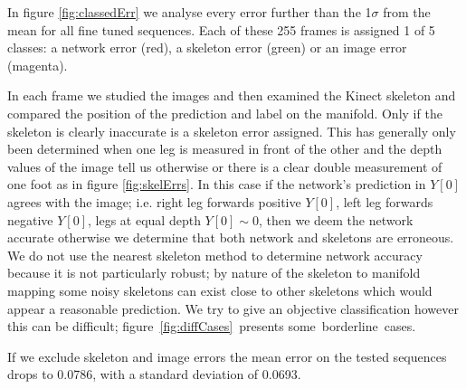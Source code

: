 \documentclass[11pt]{article} %
\begin{document}
In figure \ref{fig:classedErr} we analyse every error further than the 1$\sigma$ from the mean for all fine tuned sequences. Each of these 255 frames is assigned 1 of 5 classes: a network error (red), a skeleton error (green) or an image error (magenta).

In each frame we studied the images and then examined the Kinect skeleton and compared the position of the prediction and label on the manifold. Only if the skeleton is clearly inaccurate is a skeleton error assigned. This has generally only been determined when one leg is measured in front of the other and the depth values of the image tell us otherwise or there is a clear double measurement of one foot as in figure \ref{fig:skelErrs}. In this case if the network's prediction in $Y[0]$ agrees with the image; i.e. right leg forwards positive $Y[0]$,  left leg forwards negative $Y[0]$, legs at equal depth $Y[0]\sim 0$, then we deem the network accurate otherwise we determine that both network and skeletons are erroneous. We do not use the nearest skeleton method to determine network accuracy because it is not particularly robust; by nature of the skeleton to manifold mapping some noisy skeletons can exist close to other skeletons which would appear a reasonable prediction. We try to give an objective classification however this can be difficult; figure~\ref{fig:diffCases}~presents some~borderline~cases. 

If we exclude skeleton and image errors the mean error on the tested sequences drops to 0.0786, with a standard deviation of 0.0693. 
\end{document}

